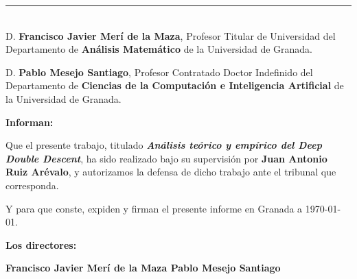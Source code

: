%

\thispagestyle{empty}

\vspace*{\fill}

\noindent\rule[-1ex]{\textwidth}{2pt}\\[4.5ex]

D. \textbf{Francisco Javier Merí de la Maza}, Profesor Titular de Universidad del Departamento de \textbf{Análisis Matemático} de la Universidad de Granada.\newline

D. \textbf{Pablo Mesejo Santiago}, Profesor Contratado Doctor Indefinido del Departamento de \textbf{Ciencias de la Computación e Inteligencia Artificial} de la Universidad de Granada.\newline

\vspace{0.5cm}

\textbf{Informan:}

\vspace{0.5cm}

Que el presente trabajo, titulado \textit{\textbf{Análisis teórico y empírico del Deep Double Descent}}, ha sido realizado bajo su supervisión por \textbf{Juan Antonio Ruiz Arévalo}, y autorizamos la defensa de dicho trabajo ante el tribunal que corresponda.

\vspace{0.5cm}

Y para que conste, expiden y firman el presente informe en Granada a \today.

\vspace{1cm}

\textbf{Los directores:}

\vspace{5cm}

\noindent \textbf{Francisco Javier Merí de la Maza \; \; \; \; \; Pablo Mesejo Santiago}

\vspace*{\fill}

\clearpage
\endinput